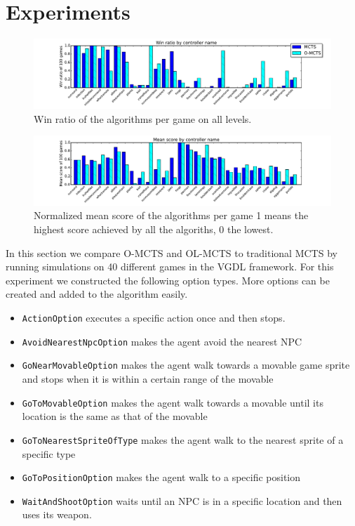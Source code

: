 \section{Experiments}
\label{sec:experiments}
\begin{figure}
	\centering
	\includegraphics[width=\textwidth]{includes/wins}
	\caption{Win ratio of the algorithms per game on all levels.}
	\label{fig:wins}
\end{figure}

\begin{figure}
	\centering
	\includegraphics[width=\textwidth]{includes/scores}
	\caption{Normalized mean score of the algorithms per game 1 means the
	highest score achieved by all the algoriths, 0 the lowest.}
	\label{fig:scores}
\end{figure}

In this section we compare O-MCTS and OL-MCTS to traditional MCTS by running
simulations on 40 different games in the VGDL framework. For this experiment
we constructed the following option types. More options can be created and added
to the algorithm easily.

\begin{itemize}[noitemsep]
	\item \texttt{ActionOption} executes a specific action once and then
		stops.
	\item \texttt{AvoidNearestNpcOption} makes the agent avoid the nearest NPC
	\item \texttt{GoNearMovableOption} makes the agent walk towards a
		movable game sprite and stops when it is within a certain range of the
		movable
	\item \texttt{GoToMovableOption} makes the agent walk towards a
		movable until its location is the same as that of the movable
	\item \texttt{GoToNearestSpriteOfType} makes the agent walk to the nearest sprite of
		a specific type
	\item \texttt{GoToPositionOption} makes the agent walk to a specific position
	\item \texttt{WaitAndShootOption} waits until an NPC is in a specific location and
		then uses its weapon.
\end{itemize}

